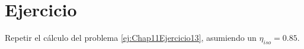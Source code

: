 \section{Ejercicio}\label{ej:Chap11Ejercicio15}
Repetir el cálculo del problema \ref{ej:Chap11Ejercicio13}, asumiendo un $\eta_{iso}=0.85$.